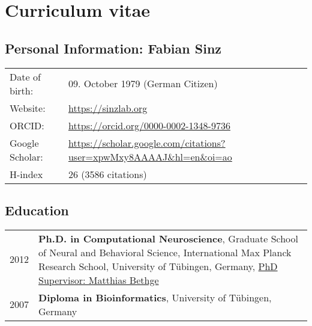 \documentclass[COG,11pt]{ercgrant}
\begin{document}
% 	
% 	

\newpage
\section{Curriculum vitae}

\subsection{Personal Information: Fabian Sinz}
\begin{tabular}{p{3cm}l}
	Date of birth:         & 09. October 1979 (German Citizen)     \\
	Website:               & \url{https://sinzlab.org}     \\
	ORCID:                 &  \url{https://orcid.org/0000-0002-1348-9736}      \\
        Google Scholar:         & \url{https://scholar.google.com/citations?user=xpwMxy8AAAAJ&hl=en&oi=ao}\\
        H-index  & 26 (3586 citations)
\end{tabular}

\subsection{Education}
\begin{tabular}{p{3cm}p{12cm}}
	2012
	 & \textbf{Ph.D. in Computational Neuroscience}, Graduate School of Neural and Behavioral Science, International Max Planck Research School, University of Tübingen, Germany, \underline{PhD Supervisor: Matthias Bethge}\\
    2007 & \textbf{Diploma in Bioinformatics}, University of Tübingen, Germany
\end{tabular}
\end{document}
